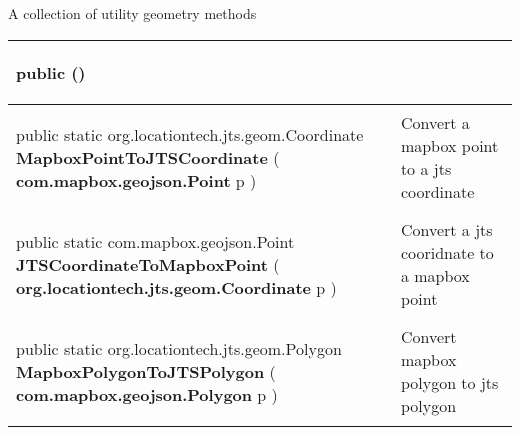  {\scriptsize A collection of utility geometry methods
 
\vspace*{-5pt} 
\begin{tabularx}{\linewidth}{X|m{}}
\label{tab:GeometryUtilities}
\begin{raggedleft}public  \textbf{\hyperref[tab:GeometryUtilities]{\color{blue}{GeometryUtilities}}}()
\end{raggedleft} &
 \\ \hline 
\begin{raggedleft}public static org.locationtech.jts.geom.Coordinate \textbf{MapboxPointToJTSCoordinate }(\hspace*{ 5pt} \textbf{com.mapbox.geojson.Point} p  )
\end{raggedleft} &
 Convert a mapbox point to a jts coordinate\\ \hline 
\begin{raggedleft}public static com.mapbox.geojson.Point \textbf{JTSCoordinateToMapboxPoint }(\hspace*{ 5pt} \textbf{org.locationtech.jts.geom.Coordinate} p  )
\end{raggedleft} &
 Convert a jts cooridnate to a mapbox point\\ \hline 
\begin{raggedleft}public static org.locationtech.jts.geom.Polygon \textbf{MapboxPolygonToJTSPolygon }(\hspace*{ 5pt} \textbf{com.mapbox.geojson.Polygon} p  )
\end{raggedleft} &
 Convert mapbox polygon to jts polygon\\\end{tabularx}
}
